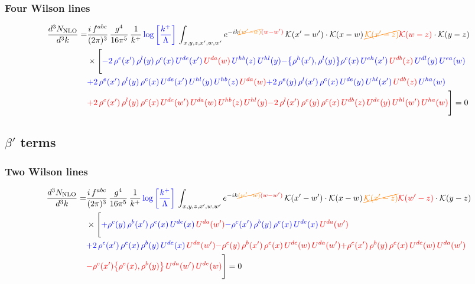 \documentclass[9pt]{article}
\numberwithin{equation}{section}
\begin{document}
\subsubsection{Four Wilson lines}
\begin{align}
    \frac{d^{3}N_{\rm NLO}}{d^{3}k}= & \frac{i\,f^{abc}}{(2\pi)^{3}}\,\frac{g^{4}}{16\pi^{5}}\,\frac{1}{k^{+}}\,{\color{blue}\log{\left[\frac{k^{+}}{\Lambda}\right]}}\,\int_{x,y,z,x',w,w'}e^{-ik{\color{orange}\cancel{(w'-w)}}{\color{red}(w-w')}}\,\mathcal{K}(x'-w')\cdot\mathcal{K}(x-w)\,{\color{orange}\cancel{\mathcal{K}(x'-z)}}{\color{red}\mathcal{K}(w-z)}\cdot\mathcal{K}(y-z)\notag \\ & \times\Bigg[{\color{blue}-2\,\rho^{e}(x')\,\rho^{l}(y)\,\rho^{c}(x)\, U^{de}(x')\,{\color{red}U^{da}(w)}\,U^{hb}(z)\,U^{hl}(y)}{\color{blue}-\big\{\rho^{h}(x'),\rho^{l}(y)\big\}\rho^{c}(x)\,U^{eh}(x')\,{\color{red}U^{db}(z)}\,U^{dl}(y)\,U^{ea}(w)}\notag \\ & {\color{blue}+2\,\rho^{e}(x')\,\rho^{l}(y)\, \rho^{c}(x)\, U^{de}(x')\,U^{hl}(y)\,U^{hb}(z)\,{\color{red}U^{da}(w)}} {\color{blue}+2\,\rho^{e}(y)\,\rho^{l}(x')\, \rho^{c}(x)\, U^{de}(y)\,U^{hl}(x')\,{\color{red}U^{db}(z)}\,U^{ha}(w)}\notag \\ & {\color{red}+2\,\rho^{e}(x')\,\rho^{l}(y)\,\rho^{c}(x)\, U^{de}(w')\,{\color{red}U^{da}(w)}\,U^{hb}(z)\,U^{hl}(y)}{\color{red}-2\,\rho^{l}(x')\,\rho^{e}(y)\, \rho^{c}(x)\, {\color{red}U^{db}(z)}\,U^{de}(y)\,U^{hl}(w')\,{\color{red}U^{ha}(w)}}\Bigg] = 0
\end{align}    
\subsection{$\beta'$ terms}
\subsubsection{Two Wilson lines}
\begin{align}
    \frac{d^{3}N_{\rm NLO}}{d^{3}k}= & \frac{i\,f^{abc}}{(2\pi)^{3}}\,\frac{g^{4}}{16\pi^{5}}\,\frac{1}{k^{+}}\,{\color{blue}\log{\left[\frac{k^{+}}{\Lambda}\right]}}\,\int_{x,y,z,x',w,w'}e^{-ik{\color{orange}\cancel{(w'-w)}}{\color{red}(w-w')}}\,\mathcal{K}(x'-w')\cdot\mathcal{K}(x-w)\,{\color{orange}\cancel{\mathcal{K}(x'-z)}}{\color{red}\mathcal{K}(w'-z)}\cdot\mathcal{K}(y-z)\notag \\ & \times\Bigg[{\color{blue}+\rho^{c}(y)\,\rho^{b}(x')\,\rho^{e}(x)\,U^{de}(x)\,{\color{red}U^{da}(w')}}{\color{blue}-\rho^{c}(x')\,\rho^{b}(y)\,\rho^{e}(x)\,U^{de}(x)\,{\color{red}U^{da}(w')}}\notag \\ & {\color{blue}+2\,\rho^{c}(x')\,\rho^{e}(x)\,\rho^{b}(y)\,U^{de}(x)\,{\color{red}U^{da}(w')}}{\color{red}-\rho^{c}(y)\,\rho^{b}(x')\,\rho^{e}(x)\,U^{de}(w)\,{\color{red}U^{da}(w')}}{\color{red}+\rho^{c}(x')\,\rho^{b}(y)\,\rho^{e}(x)\,U^{de}(w)\,{\color{red}U^{da}(w')}}\notag \\ & {\color{red} -\rho^{c}(x')\big\{\rho^{e}(x),\rho^{b}(y)\big\}\,{\color{red}U^{da}(w')}\,U^{de}(w)}\Bigg] = 0 
\end{align}    
\end{document}

